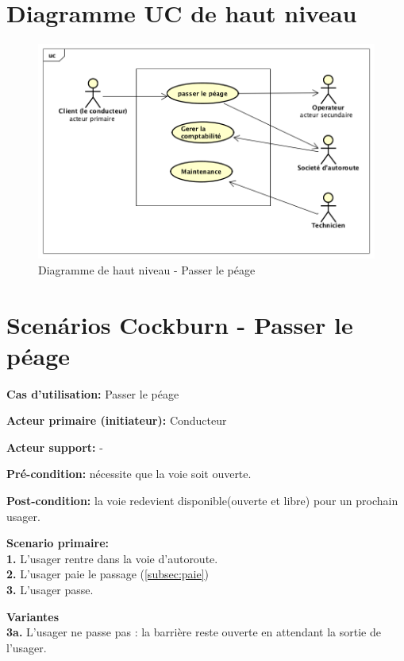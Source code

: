 \label{Cap:TD2}

\section{Diagramme UC de haut niveau}
\begin{figure}[h]
    \centering
    \includegraphics[scale=0.55]{images/hautNiveau.png}
    \caption{Diagramme de haut niveau - Passer le péage}
    \label{fig:my_label}
\end{figure}
\newpage
\section{Scenários Cockburn - Passer le péage}\label{sec:passer}
    \textbf{Cas d'utilisation:} Passer le péage
    
    \textbf{Acteur primaire (initiateur):} Conducteur
    
    \textbf{Acteur support:} -
    
    \textbf{Pré-condition: } nécessite que la voie soit ouverte.
    
    \textbf{Post-condition: }   la voie redevient disponible(ouverte et libre) pour un prochain usager.
    
    \textbf{Scenario primaire: } \\
    \textbf{1.} L’usager rentre dans la voie d’autoroute. \\
    \textbf{2.} L’usager paie le passage (\ref{subsec:paie})\\
    \textbf{3.} L’usager passe.
    
    \textbf{Variantes}\\
    \textbf{3a.} L'usager ne passe pas : la barrière reste ouverte en attendant la sortie de l’usager.

